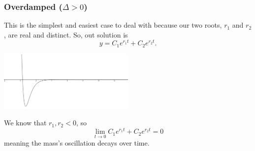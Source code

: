 \subsubsection{Overdamped ($\Delta > 0$)}
This is the simplest and easiest case to deal with because our two roots, $r_1$ and $r_2$, are real and distinct. So, out solution is
\begin{equation*}
	y = C_1e^{r_1 t} + C_2e^{r_2 t}.
\end{equation*}
\begin{center}
	\includegraphics[width=0.5\textwidth]{./higherOrder/freeVibrs/overdamped.png}
\end{center}
We know that $r_1, r_2 < 0$, so
\begin{equation*}
	\lim\limits_{t \to 0}{C_1e^{r_1 t} + C_2e^{r_2 t}} = 0
\end{equation*}
meaning the mass's oscillation decays over time.